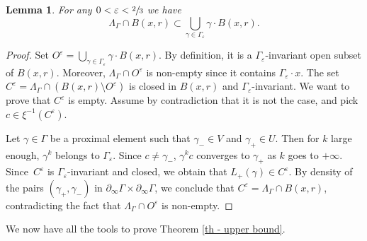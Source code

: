 \documentclass[JEP,XML,SOM,Unicode,NoEqCountersInSection,NoFloatCountersInSection,published]{cedram}
\newtheorem{lemma}[theo]{Lemma}
\theoremstyle{definition}
\let\epsilon\varepsilon
\let\G\Gamma
\let\g\gamma
\begin{document}
\begin{lemma} \label{lem - covering the limit set}
For any $0<\epsilon< \sfrac{2}{3}$ we have
\[\Lambda_\Gamma\cap B(x,r) \subset \bigcup_{\g \in \G_\epsilon} \g \cdot B(x,r).\]
\end{lemma}

\begin{proof}
Set $O^\epsilon = \bigcup_{\g \in \G_\epsilon} \g \cdot B(x,r)$.
By definition, it is a $\G_\epsilon$-invariant open subset of $B(x,r)$. Moreover, $\Lambda_\Gamma \cap O^\epsilon$ is non-empty since it contains $\G_\epsilon \cdot x$. The set $C^\epsilon = \Lambda_\G \cap (B(x,r)\setminus O^\epsilon)$ is closed in $B(x,r)$ and $\G_\epsilon$-invariant. We want to prove that $C^\epsilon$ is empty. Assume by contradiction that it is not the case, and pick $c \in \xi^{-1}(C^\epsilon)$.

Let $\g \in \G$ be a proximal element such that $\g_- \in V$ and $\g_+ \in U$. Then for $k$ large enough, $\g^k$ belongs to $\G_\epsilon$. Since $c\neq \g_-$, $\g^k c$ converges to $\g_+$ as $k$ goes to $+\infty$. Since~$C^\epsilon$ is $\G_\epsilon$-invariant and closed, we obtain that $L_+(\g)\in C^\epsilon$. By density of the pairs $(\g_+,\g_-)$ in $\partial_\infty \G\times\partial_\infty\G$, we conclude that $C^\epsilon = \Lambda_\Gamma\cap B(x,r)$, contradicting the fact that $\Lambda_\Gamma \cap O^\epsilon$ is non-empty.
\end{proof}

We now have all the tools to prove Theorem \ref{th - upper bound}.
\end{document}
